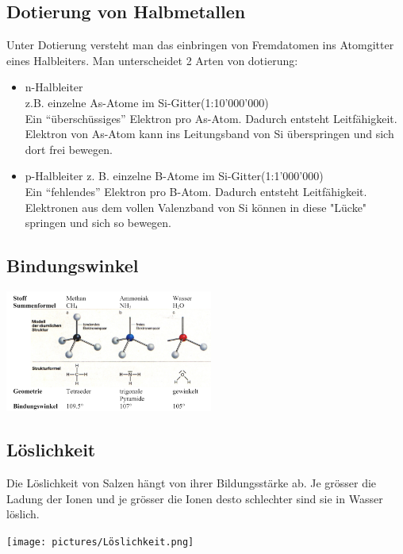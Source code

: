 \subsection{Dotierung von Halbmetallen}
    Unter Dotierung versteht man das einbringen von Fremdatomen ins Atomgitter eines Halbleiters. Man unterscheidet 2 Arten von dotierung:
    \begin{itemize}
        \item n-Halbleiter\\
        z.B. einzelne As-Atome im Si-Gitter(1:10'000'000)\\Ein ``überschüssiges'' Elektron pro As-Atom. Dadurch entsteht Leitfähigkeit. Elektron von As-Atom kann ins Leitungsband von Si überspringen und sich dort frei bewegen.
        \item p-Halbleiter
        z. B. einzelne B-Atome im Si-Gitter(1:1'000'000)\\Ein ``fehlendes'' Elektron pro B-Atom. Dadurch entsteht Leitfähigkeit. Elektronen aus dem vollen Valenzband von Si können in diese "Lücke" springen und sich so bewegen.
    \end{itemize}
\subsection{Bindungswinkel}
    \begin{center}
    \includegraphics[height=4cm]{pictures/Winkel.png}
    \end{center}
\subsection{Löslichkeit}
    Die Löslichkeit von Salzen hängt von ihrer Bildungsstärke ab. Je grösser die Ladung der Ionen und je grösser die Ionen desto schlechter sind sie in Wasser löslich.
    \begin{center}
    \texttt{[image: pictures/Löslichkeit.png]}
    \end{center}